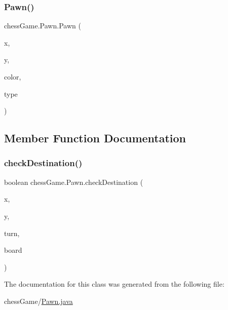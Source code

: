 \subsubsection{\texorpdfstring{Pawn()}{Pawn()}}
{\footnotesize\ttfamily chess\+Game.\+Pawn.\+Pawn (\begin{DoxyParamCaption}\item[{int}]{x,  }\item[{int}]{y,  }\item[{\hyperlink{classchess_game_1_1_piece_ad5117cbbbaebf3a27c4f3c2bcbd6678b}{color}}]{color,  }\item[{\hyperlink{classchess_game_1_1_piece_a1370c7f61581a1b72fa8ac2fd1af70a2}{type}}]{type }\end{DoxyParamCaption})}



\subsection{Member Function Documentation}
\hypertarget{classchess_game_1_1_pawn_ae85b0f679d8f19efc7d99c155633039f}{}\label{classchess_game_1_1_pawn_ae85b0f679d8f19efc7d99c155633039f} 
\subsubsection{\texorpdfstring{check\+Destination()}{checkDestination()}}
{\footnotesize\ttfamily boolean chess\+Game.\+Pawn.\+check\+Destination (\begin{DoxyParamCaption}\item[{int}]{x,  }\item[{int}]{y,  }\item[{int}]{turn,  }\item[{\hyperlink{classchess_game_1_1_chess_board}{Chess\+Board}}]{board }\end{DoxyParamCaption})}



The documentation for this class was generated from the following file\+:\begin{DoxyCompactItemize}
\item 
chess\+Game/\hyperlink{_pawn_8java}{Pawn.\+java}\end{DoxyCompactItemize}
